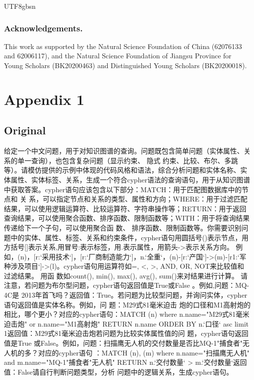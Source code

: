 \documentclass[runningheads]{llncs}
\begin{document}
\begin{CJK*}{UTF8}{gbsn}
\subsubsection{Acknowledgements.} 
This work as supported by the Natural Science Foundation of China (62076133 and 62006117), and the Natural Science Foundation of Jiangsu Province for Young Scholars (BK20200463) and Distinguished Young Scholars (BK20200018).

\appendix

\section*{Appendix 1}
\label{appendix_prior_knowledge}
\subsection*{Original}
给定一个中文问题，用于对知识图谱的查询。问题既包含简单问题（实体属性、关系的单一查询），也包含复杂问题（显示约束、 隐式 约束、比较、布尔、多跳等）。请模仿提供的示例中体现的代码风格和语法，综合分析问题和实体名称、实体属性、实体标签、关系，生成一个符合cypher语法的查询语句，用于从知识图谱中获取答案。cypher语句应该包含以下部分：MATCH：用于匹配图数据库中的节点和 关 系，可以指定节点和关系的类型、属性和方向；WHERE：用于过滤匹配结果，可以使用逻辑运算符、比较运算符、字符串操作等；RETURN：用于返回查询结果，可以使用聚合函数、排序函数、限制函数等；WITH：用于将查询结果传递给下一个子句，可以使用聚合函 数、 排序函数、限制函数等。你需要识别问题中的实体、属性、标签、关系和约束条件，cypher语句用圆括号()表示节点，用方括号[]表示关系,用冒号:表示标签，用.表示属性，用箭头->表示关系方向。 例如，(n)，[r:`采用技术`]，[r:`厂商制造能力`]，n.`全重`，(n)-[r:`产国`]->(m)-[r1:`军种涉及项目`]->(l)。cypher语句用运算符如=, <, >, AND, OR, NOT来比较值和过滤结果。 用函 数如count(), min(), max(), avg(), sum()来对结果进行计算。 请注意，若问题为布尔型问题，cypher语句返回值是True或False 。例如,问题：MQ-4C是 2013年首飞吗？返回值：True。若问题为比较型问题，并询问实体，cypher语句返回值是实体名称。例如，问 题：M29式81毫米迫击 炮的口径和M1高射炮的相比，哪个更小？对应的cypher语句：MATCH (n) where n.name="M29式81毫米迫击炮" or n.name="M1高射炮" RETURN n.name ORDER BY n.`口径` asc limit 1返回值：M29式81毫米迫击炮若问题为比较实体属性值的问 题，cypher语句返回值是True 或False。例如，问题：扫描鹰无人机的交付数量是否比MQ-1"捕食者"无人机的多？对应的cypher语句 ：MATCH (n), (m) where n.name="扫描鹰无人机" and m.name="MQ-1"捕食者"无人机" RETURN n.`交付数量` > m.`交付数量`返回 值：False请自行判断问题类型，分析 问题中的逻辑关系，生成cypher语句。

\end{CJK*}
\end{document}
